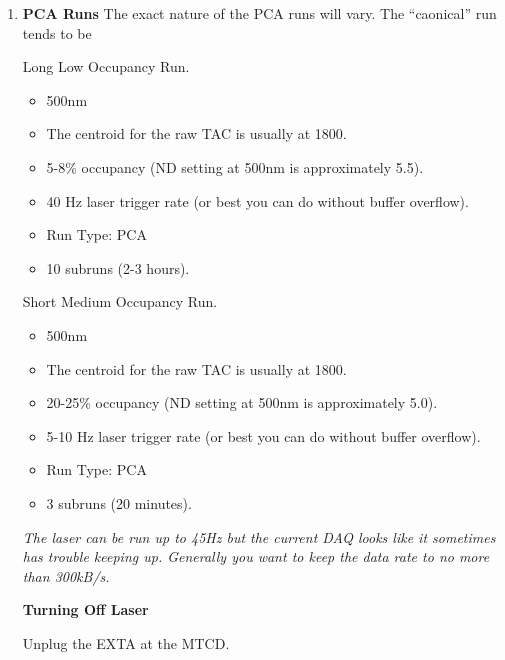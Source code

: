 \begin{enumerate}
\checkitem Plug the Laserball Trigger signal into the EXTA input on the
  MTCD.
  

\begin{center}
                 {\bf Taking PCA Data}
\end{center}
\item {\bf PCA Runs}
  The exact nature of the PCA runs will vary.  The ``caonical''
  run tends to be 
  \begin{enumerate}
  \checkitem Long Low Occupancy Run.
    \begin{itemize}
    \item 500nm
    \item The centroid for the raw TAC is usually at 1800.
    \item 5-8\% occupancy (ND setting at 500nm is approximately 5.5).
    \item 40 Hz laser trigger rate (or best you can do without buffer
          overflow).
    \item Run Type: PCA 
    \item 10 subruns (2-3 hours).
    \end{itemize}
  \checkitem Short Medium Occupancy Run.
    \begin{itemize}
    \item 500nm
    \item The centroid for the raw TAC is usually at 1800.
    \item 20-25\% occupancy (ND setting at 500nm is approximately 5.0).
    \item 5-10 Hz laser trigger rate (or best you can do without buffer
          overflow).
    \item Run Type: PCA 
    \item 3 subruns (20 minutes).
    \end{itemize}
  \end{enumerate}
\small
{\em
  The laser can be run up to 45Hz but the current DAQ looks like
it sometimes has trouble keeping up.  Generally you want to keep
the data rate to no more than 300kB/s.
}
\normalsize


\begin{center}
                 {\bf Turning Off Laser}
\end{center}

\checkitem Unplug the  EXTA at the MTCD.


\end{enumerate}
